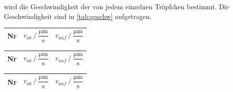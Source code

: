 wird die Geschwindigkeit der von jedem einzelnen Tröpfchen bestimmt.
Die Geschwindigkeit sind in \autoref{tab:geschw} aufgetragen.
\begin{table}[H]
  \caption{Geschwindigkeiten der Öltröpfchen für verschiedene Spannungen}
  \label{tab:geschw}
  \centering
  \begin{subtable}[t]{0.45\textwidth}
      \small
      \label{stab:v157}
      \begin{table}[H]
          \centering
          \begin{tabular}{S S S}
            \toprule
              {Nr}& {$ v_{ab} \mathbin{/} \dfrac{\unit{\micro\meter}}{\unit{\second}}$}&{$ v_{auf} \mathbin{/} \dfrac{\unit{\micro\meter}}{\unit{\second}}$}\\
            \midrule
            
            \bottomrule
          \end{tabular}
        \end{table}
      
  \end{subtable}\qquad
  \begin{subtable}[t]{0.45\textwidth}
      \small
      \label{stab:v175}
      \begin{table}[H]
          \centering
          \begin{tabular}{S S S}
            \toprule
            {Nr}& {$ v_{ab} \mathbin{/} \dfrac{\unit{\micro\meter}}{\unit{\second}}$}&{$ v_{auf} \mathbin{/} \dfrac{\unit{\micro\meter}}{\unit{\second}}$}\\
            \midrule
            
            \bottomrule
          \end{tabular}
        \end{table}
      
  \end{subtable}\qquad
  \begin{subtable}[t]{0.45\textwidth}
      \small
      \label{stab:v200}
      \begin{table}[H]
          \centering
          \begin{tabular}{S S S}
            \toprule
            {Nr}& {$ v_{ab} \mathbin{/} \dfrac{\unit{\micro\meter}}{\unit{\second}}$}&{$ v_{auf} \mathbin{/} \dfrac{\unit{\micro\meter}}{\unit{\second}}$}\\
            \midrule
            

\end{tabular}
\end{table}
\end{subtable}
\end{table}
